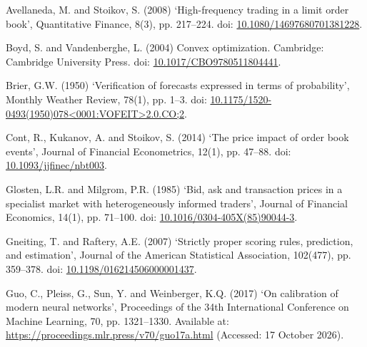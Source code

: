 {\fontsize{10.5}{13.4}\selectfont\setlength{\parskip}{4pt}
\needspace{44pt}\hypertarget{ref:avellaneda2008}{}\noindent\hangindent=15pt Avellaneda, M. and Stoikov, S. (2008) ‘High-frequency trading in a limit order book’, Quantitative Finance, 8(3), pp. 217--224. doi: \url{10.1080/14697680701381228}.\par\vspace{3pt}
\needspace{44pt}\hypertarget{ref:boyd2004}{}\noindent\hangindent=15pt Boyd, S. and Vandenberghe, L. (2004) Convex optimization. Cambridge: Cambridge University Press. doi: \url{10.1017/CBO9780511804441}.\par\vspace{3pt}
\needspace{44pt}\hypertarget{ref:brier1950}{}\noindent\hangindent=15pt Brier, G.W. (1950) ‘Verification of forecasts expressed in terms of probability’, Monthly Weather Review, 78(1), pp. 1--3. doi: \url{10.1175/1520-0493(1950)078<0001:VOFEIT>2.0.CO;2}.\par\vspace{3pt}
\needspace{44pt}\hypertarget{ref:cont2014}{}\noindent\hangindent=15pt Cont, R., Kukanov, A. and Stoikov, S. (2014) ‘The price impact of order book events’, Journal of Financial Econometrics, 12(1), pp. 47--88. doi: \url{10.1093/jjfinec/nbt003}.\par\vspace{3pt}
\needspace{44pt}\hypertarget{ref:glosten1985}{}\noindent\hangindent=15pt Glosten, L.R. and Milgrom, P.R. (1985) ‘Bid, ask and transaction prices in a specialist market with heterogeneously informed traders’, Journal of Financial Economics, 14(1), pp. 71--100. doi: \url{10.1016/0304-405X(85)90044-3}.\par\vspace{3pt}
\needspace{44pt}\hypertarget{ref:gneiting2007}{}\noindent\hangindent=15pt Gneiting, T. and Raftery, A.E. (2007) ‘Strictly proper scoring rules, prediction, and estimation’, Journal of the American Statistical Association, 102(477), pp. 359--378. doi: \url{10.1198/016214506000001437}.\par\vspace{3pt}
\needspace{44pt}\hypertarget{ref:guo2017}{}\noindent\hangindent=15pt Guo, C., Pleiss, G., Sun, Y. and Weinberger, K.Q. (2017) ‘On calibration of modern neural networks’, Proceedings of the 34th International Conference on Machine Learning, 70, pp. 1321--1330. Available at: \url{https://proceedings.mlr.press/v70/guo17a.html} (Accessed: 17 October 2026).\par\vspace{3pt}
}

